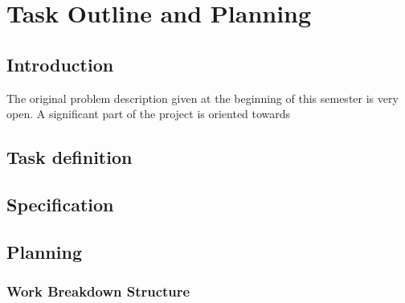 \chapter{Task Outline and Planning}
\label{chp:TaskOutlineAndPlanning}

\section{Introduction}

The original problem description given at the beginning of this semester is very open. A significant part of the project is oriented towards 

\section{Task definition}

\section{Specification}

\section{Planning}

\subsection{Work Breakdown Structure}